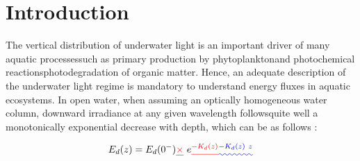 \section{Introduction}

The vertical distribution of underwater light is an important driver of many aquatic processes\DIFaddbegin \DIFadd{, }\DIFaddend such as primary production by phytoplankton\DIFaddbegin \DIFadd{, }\DIFaddend and photochemical reactions\DIFdelbegin {}\DIFdelend \DIFaddbegin {}\DIFaddend photodegradation of organic matter. Hence, an adequate description of the underwater light regime is mandatory to understand energy fluxes in aquatic ecosystems. In open water, when assuming an optically homogeneous water column, downward irradiance at any given wavelength follows\DIFaddbegin {}\DIFaddend quite well a monotonically exponential decrease with depth, which can be \DIFdelbegin {}\DIFdelend \DIFaddbegin {}\DIFaddend as follows \citep{Kirk1994} \DIFaddbegin {}\DIFaddend :

\begin{equation}
    \edz{} = \edzero{}\DIFdelbegin \DIFdel{\times }\DIFdelend \DIFaddbegin \DIFadd{~}\DIFaddend e\DIFdelbegin \DIFdel{^{-\ked(z)}
    }\DIFdelend \DIFaddbegin \DIFadd{^{-\ked(z)~z}
    }\DIFaddend \label{eq:edz}
\end{equation}

